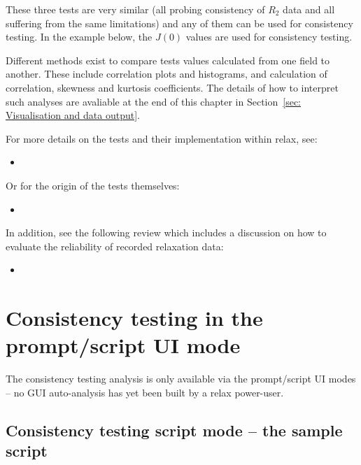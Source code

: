 These three tests are very similar (all probing consistency of $R_2$ data and all suffering from the same limitations) and any of them can be used for consistency testing.  In the example below, the $J(0)$ values are used for consistency testing.

Different methods exist to compare tests values calculated from one field to another.  These include correlation plots and histograms, and calculation of correlation, skewness and kurtosis coefficients. The details of how to interpret such analyses are avaliable at the end of this chapter in Section~\ref{sec: Visualisation and data output}.

For more details on the tests and their implementation within relax, see:

\begin{itemize}
\item {}
\end{itemize}

Or for the origin of the tests themselves:

\begin{itemize}
\item {}
\end{itemize}

In addition, see the following review which includes a discussion on how to evaluate the reliability of recorded relaxation data:

\begin{itemize}
\item {}
\end{itemize}




\section{Consistency testing in the prompt/script UI mode}

The consistency testing analysis is only available via the prompt/script UI modes -- no GUI auto-analysis has yet been built by a relax power-user.



\subsection{Consistency testing script mode -- the sample script} \label{sect: consistency tests - sample script}

